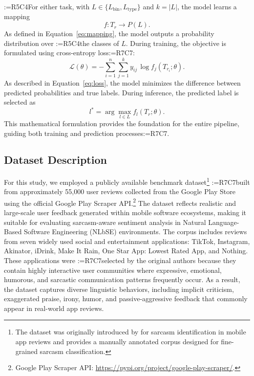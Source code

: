 \documentclass[a4paper,fleqn]{cas-sc}
\makeatletter
\newif\iftracked
\newcommand{\rv@setcolour}[1]{%
  \IfStrEq{#1}{R7C7}{\color{rvEdit}}{%
    \IfSubStr{#1}{R5}{\IfSubStr{#1}{R7}{\color{rvBoth}}{\color{rvFive}}}{\color{rvSeven}}}}
\newcommand{\rv@tag}[1]{\textsuperscript{\sffamily\bfseries\scriptsize[\StrSubstitute{#1}{,}{, }]}\,}
\newcommand{\rv@recordone}[1]{%
  \edef\rv@i{#1}%
  \ifcsdef{rv@n@\rv@i}{}{\csgdef{rv@n@\rv@i}{0}}%
  \csxdef{rv@n@\rv@i}{\the\numexpr\csuse{rv@n@\rv@i}+1\relax}%
  \begingroup\edef\@currentlabel{\rv@i}\label{rv:\rv@i:\csuse{rv@n@\rv@i}}\endgroup}
\newcommand{\rv@record}[1]{\@for\rv@id:=#1\do{\expandafter\rv@recordone\expandafter{\rv@id}}}
\DeclareRobustCommand{\rc}[2]{\rv@record{#1}\iftracked{\rv@setcolour{#1}\rv@tag{#1}#2}\else#2\fi}
\DeclareRobustCommand{\rcdel}[2]{\rv@record{#1}\iftracked{\rv@setcolour{#1}\rv@tag{#1}\rv@strike{#2}}\else\unskip\fi}
\DeclareRobustCommand{\rcrep}[3]{\rv@record{#1}\iftracked{\rv@setcolour{#1}\rv@tag{#1}\rv@strike{#2} #3}\else#3\fi}
\DeclareRobustCommand{\rce}[1]{\rv@record{R7C7}\iftracked{\color{rvEdit}#1}\else#1\fi}
\makeatother
\begin{document}
\rc{R5C4}{For either task, with $L \in \{L_{\mathrm{bin}}, L_{\mathrm{type}}\}$ and $k = |L|$,} the model learns a mapping
\begin{equation}
f : T_r \rightarrow P(L).
\label{eq:mapping}
\end{equation}
As defined in Equation~\eqref{eq:mapping}, the model outputs a probability distribution over \rcrep{R5C4}{sarcasm classes}{the classes of $L$}. During training, the objective is formulated using cross-entropy loss\rce{:}
\begin{equation}
\mathcal{L}(\theta) = -\sum_{i=1}^{n}\sum_{j=1}^{k} y_{ij}\,\log f_{j}(T_{r_i};\theta).
\label{eq:loss}
\end{equation}
As described in Equation~\eqref{eq:loss}, the model minimizes the difference between predicted probabilities and true labels. During inference, the predicted label is selected as
\begin{equation}
l^{*} = \arg\max_{l \in L} f_{l}(T_r;\theta).
\label{eq:argmax}
\end{equation}
This mathematical formulation provides the foundation for the entire pipeline, guiding both training and prediction processes\rcdel{R7C7}{in above Equation (6)}.

\subsection{Dataset Description}
\label{sec:dataset}
For this study, we employed a publicly available benchmark dataset\footnote{The dataset was originally introduced by \citet{fatima2024exploratory} for sarcasm identification in mobile app reviews and provides a manually annotated corpus designed for fine-grained sarcasm classification.} \rcrep{R7C7}{consisting of}{built from} approximately 55,000 user reviews collected from the Google Play Store using the official Google Play Scraper API.\footnote{Google Play Scraper API: \url{https://pypi.org/project/google-play-scraper/}.} The dataset reflects realistic and large-scale user feedback generated within mobile software ecosystems, making it suitable for evaluating sarcasm-aware sentiment analysis in Natural Language-Based Software Engineering (NLbSE) environments. The corpus includes reviews from seven widely used social and entertainment applications: TikTok, Instagram, Akinator, iDrink, Make It Rain, One Star App: Lowest Rated App, and Nothing. These applications were \rcrep{R7C7}{intentionally selected}{selected by the original authors} because they contain highly interactive user communities where expressive, emotional, humorous, and sarcastic communication patterns frequently occur. As a result, the dataset captures diverse linguistic behaviors, including implicit criticism, exaggerated praise, irony, humor, and passive-aggressive feedback that commonly appear in real-world app reviews.
\end{document}
